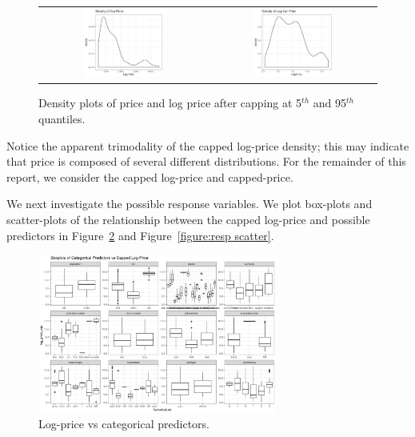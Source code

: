 \documentclass[a4paper, 10pt, titlepage]{article}
\begin{document}
\begin{figure}[!ht]
	\centering
	   \begin{tabular}{cc}
	      \includegraphics[width = 0.5\textwidth]{images/price_dense.png}  & \includegraphics[width = 0.5\textwidth]{images/logprice_dense.png} 
	   \end{tabular}
	\caption{Density plots of price and log price after capping at 5$^{th}$ and 95$^{th}$ quantiles.}
	\label{figure:capped density}
\end{figure}

Notice the apparent trimodality of the capped log-price density; this may indicate that price is composed of several different distributions. For the remainder of this report, we consider the capped log-price and capped-price.

\par

We next investigate the possible response variables. We plot box-plots and scatter-plots of the relationship between the capped log-price and possible predictors in Figure~\ref{figure:resp box} and Figure~\ref{figure:resp scatter}.

	\begin{figure}[!ht]
	\centering
	    \includegraphics[width = 0.7\textwidth]{images/resp_box.png}
	\caption{Log-price vs categorical predictors.}
	\label{figure:resp box}
    \end{figure}
\end{document}
